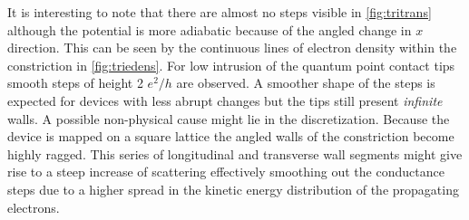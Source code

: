It is interesting to note that there are almost no steps visible in \cref{fig:tritrans} although the potential is more adiabatic because of the angled change in $x$ direction. This can be seen by the continuous lines of electron density within the constriction in \cref{fig:triedens}. For low intrusion of the quantum point contact tips smooth steps of height 2 $e^2/h$ are observed. A smoother shape of the steps is expected for devices with less abrupt changes but the tips still present \emph{infinite} walls. A possible non-physical cause might lie in the discretization. Because the device is mapped on a square lattice the angled walls of the constriction become highly ragged. This series of longitudinal and transverse wall segments might give rise to a steep increase of scattering effectively smoothing out the conductance steps due to a higher spread in the kinetic energy distribution of the propagating electrons.
\FloatBarrier

